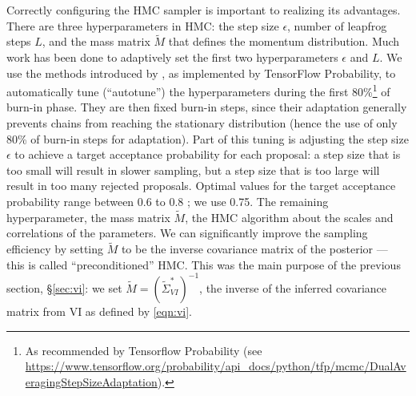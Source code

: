 Correctly configuring the HMC sampler is important to realizing its advantages. 
There are three hyperparameters in HMC: the step size $\epsilon$, number of leapfrog steps $L$, and the mass matrix $\tilde{M}$ that defines the momentum distribution. 
Much work has been done to adaptively set the first two hyperparameters $\epsilon$ and $L$. We use the methods introduced by \citet{hoffman2014,hoffman2021}, as implemented by TensorFlow Probability, to automatically tune (``autotune'') the hyperparameters during the first 80\%\footnote{As recommended by Tensorflow Probability (see \url{https://www.tensorflow.org/probability/api_docs/python/tfp/mcmc/DualAveragingStepSizeAdaptation}).} of burn-in phase. They are then fixed  burn-in steps, since their adaptation generally prevents chains from reaching the stationary distribution (hence the use of only  80\% of burn-in steps for adaptation). Part of this tuning is adjusting the step size $\epsilon$ to achieve a target acceptance probability for each proposal: a step size that is too small will result in slower sampling, but a step size that is too large will result in too many rejected proposals. Optimal values for the target acceptance probability range between 0.6 to 0.8 \citep{betancourt2018}; we use 0.75. The remaining hyperparameter, the mass matrix $\tilde{M}$,  the HMC algorithm about the scales and correlations of the parameters. We can significantly improve the sampling efficiency by setting $\tilde{M}$ to be the inverse covariance matrix of the posterior \citep[][Chap. 5]{brooks2011} --- this is called ``preconditioned'' HMC. 
This was the main purpose of the previous section, \S\ref{sec:vi}: 
we set $\tilde{M}=(\tilde{\Sigma}^*_{VI})^{-1}$, the inverse of the inferred covariance matrix from VI
as defined by \cref{eqn:vi}.  

